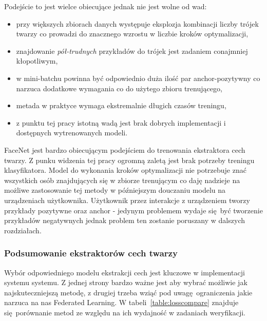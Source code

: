 Podejście to jest wielce obiecujące jednak nie jest wolne od wad:
\begin{itemize}
  \item przy większych zbiorach danych występuje eksplozja kombinacji liczby trójek twarzy co prowadzi do znacznego wzrostu w liczbie kroków optymalizacji,
  \item znajdowanie \emph{pół-trudnych} przykładów do trójek jest zadaniem conajmniej kłopotliwym,
  \item w mini-batchu powinna być odpowiednio duża ilość par anchor-pozytywny co narzuca dodatkowe wymagania co do użytego zbioru trenującego,
  \item metada w praktyce wymaga ekstremalnie długich czasów treningu,
  \item z punktu tej pracy istotną wadą jest brak dobrych implementacji i dostępnych wytrenowanych modeli. 
\end{itemize}

FaceNet jest bardzo obiecującym podejściem do trenowania ekstraktora cech twarzy. Z punku widzenia tej pracy ogromną zaletą jest brak potrzeby treningu klasyfikatora. Model do wykonania kroków optymalizacji nie potrzebuje znać wszystkich  osób znajdujących się w zbiorze trenującym co daję nadzieje na możliwe zastosowanie tej metody w późniejszym douczaniu modelu na urządzeniach użytkownika. Użytkownik przez interakcje z urządzeniem tworzy przykłady pozytywne oraz anchor - jedynym problemem wydaje się być tworzenie przykładów negatywnych jednak problem ten zostanie poruszany w dalszych rozdziałach.


\subsubsection{Podsumowanie ekstraktorów cech twarzy}\label{sec:extraktor-podsumowanie}
 Wybór odpowiedniego modelu ekstrakcji cech jest kluczowe w implementacji systemu systemu. Z jednej strony bardzo ważne jest aby wybrać możliwie jak najskuteczniejszą metodę, z drugiej trzeba wziąć pod uwagę ograniczenia jakie narzuca na nas Federated Learning. W tabeli~\ref{table:losscompare} znajduje się porównanie metod ze względu na ich wydajność w zadaniach weryfikacji.

